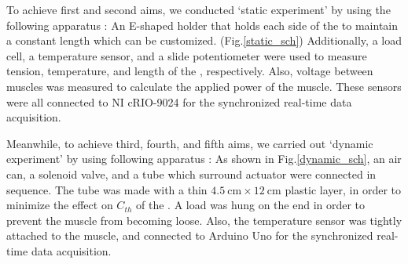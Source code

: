 To achieve first and second aims, we conducted `static experiment' by using the following apparatus : An E-shaped holder that holds each side of the \scp to maintain a constant length which can be customized. (Fig.\ref{static_sch}) Additionally, a load cell, a temperature sensor, and a slide potentiometer were used to measure tension, temperature, and length of the \scpnospace, respectively. Also, voltage between muscles was measured to calculate the applied power of the muscle. These sensors were all connected to NI cRIO-9024 for the synchronized real-time data acquisition.

Meanwhile, to achieve third, fourth, and fifth aims, we carried out `dynamic experiment' by using following apparatus : As shown in Fig.\ref{dynamic_sch}, an air can, a solenoid valve, and a tube which surround actuator were connected in sequence. 
The tube was made with a thin $\SI{4.5}{\centi\meter} \times \SI{12}{\centi\meter}$ plastic layer, in order to minimize the effect on $C_{th}$ of the \scpnospace.
A load was hung on the end in order to prevent the muscle from becoming loose. 
Also, the temperature sensor was tightly attached to the muscle, and connected to Arduino Uno for the synchronized real-time data acquisition.



